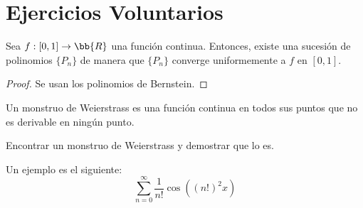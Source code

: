 \chapter{Ejercicios Voluntarios}

\begin{teo}
    Sea $f:[0,1]\to \bb{R}$ una función continua. Entonces, existe una sucesión de polinomios $\{P_n\}$ de manera que $\{P_n\}$ converge uniformemente a $f$ en $[0,1]$.
\end{teo}
\begin{proof}
    Se usan los polinomios de Bernstein.
\end{proof}

\begin{definicion}
    Un monstruo de Weierstrass es una función continua en todos sus puntos que no es derivable en ningún punto.
\end{definicion}

\begin{ejercicio*}
    Encontrar un monstruo de Weierstrass y demostrar que lo es.

    Un ejemplo es el siguiente:
    \begin{equation*}
        \sum_{n=0}^\infty \frac{1}{n!}\cos\left((n!)^2 x\right)
    \end{equation*}
\end{ejercicio*}